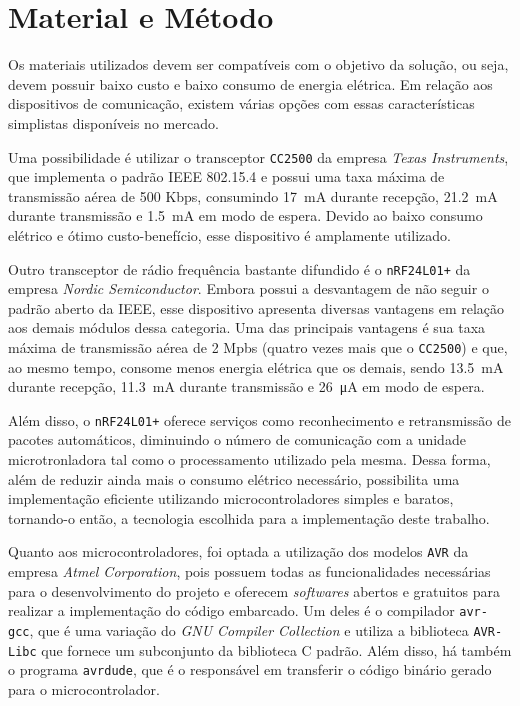 \documentclass[
    12pt,               %
    a4paper,            %
    english,            %
    brazil,             %
    ]{article}
\begin{document}

\section{Material e Método}

Os materiais utilizados devem ser compatíveis com o objetivo da solução, ou seja, devem possuir baixo custo e baixo consumo de
energia elétrica. Em relação aos dispositivos de comunicação, existem várias opções com essas características simplistas
disponíveis no mercado.

Uma possibilidade é utilizar o transceptor \texttt{CC2500} da empresa \textit{Texas Instruments}, que implementa o padrão IEEE
802.15.4 e possui uma taxa máxima de transmissão aérea de 500 Kbps, consumindo \SI{17}{\milli \ampere} durante recepção,
\SI{21.2}{\milli \ampere} durante transmissão e \SI{1.5}{\milli \ampere} em modo de espera. Devido ao baixo consumo elétrico e
ótimo custo-benefício, esse dispositivo é amplamente utilizado. \cite{ccdatasheet}

Outro transceptor de rádio frequência bastante difundido é o \texttt{nRF24L01+} da empresa \textit{Nordic Semiconductor}. Embora
possui a desvantagem de não seguir o padrão aberto da IEEE, esse dispositivo apresenta diversas vantagens em relação aos demais
módulos dessa categoria. Uma das principais vantagens é sua taxa máxima de transmissão aérea de 2 Mpbs (quatro vezes mais que o
\texttt{CC2500}) e que, ao mesmo tempo, consome menos energia elétrica que os demais, sendo \SI{13.5}{\milli \ampere} durante
recepção, \SI{11.3}{\milli \ampere} durante transmissão e \SI{26}{\micro \ampere} em modo de espera.  \cite{nrfdatasheet}

Além disso, o \texttt{nRF24L01+} oferece serviços como reconhecimento e retransmissão de pacotes automáticos, diminuindo o número
de comunicação com a unidade microtronladora tal como o processamento utilizado pela mesma. Dessa forma, além de reduzir ainda
mais o consumo elétrico necessário, possibilita uma implementação eficiente utilizando microcontroladores simples e baratos,
tornando-o então, a tecnologia escolhida para a implementação deste trabalho.

Quanto aos microcontroladores, foi optada a utilização dos modelos \texttt{AVR} da empresa \textit{Atmel Corporation}, pois
possuem todas as funcionalidades necessárias para o desenvolvimento do projeto e oferecem \textit{softwares} abertos e gratuitos
para realizar a implementação do código embarcado. Um deles é o compilador \texttt{avr-gcc}, que é uma variação do \textit{GNU
Compiler Collection} e utiliza a biblioteca \texttt{AVR-Libc} que fornece um subconjunto da biblioteca C padrão. Além disso, há
também o programa \texttt{avrdude}, que é o responsável em transferir o código binário gerado para o microcontrolador.
\end{document}

